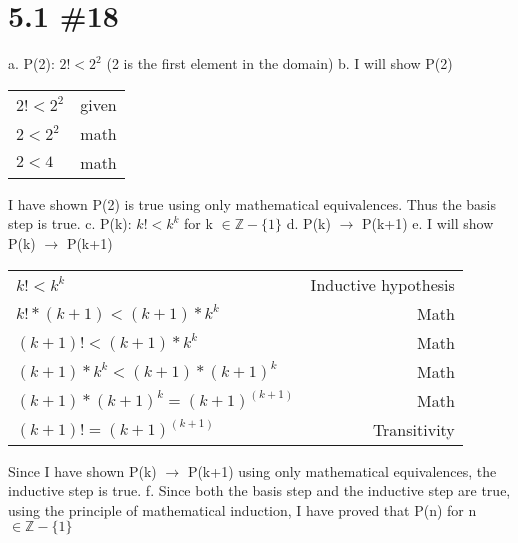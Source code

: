 \documentclass[h]{article}
\begin{document}
\section*{5.1 \#18}
a. P(2): $2! < 2^2$ (2 is the first element in the domain)\newline
b. I will show P(2)\newline
\begin{tabular}{l|r}
$2! < 2^2$ & given\\
$2 < 2^2$& math\\
$2 < 4$ & math\\
\end{tabular}\newline
I have shown P(2) is true using only mathematical equivalences. Thus the basis step is true.\newline
c. P(k): $k! < k^k$ for k $\in \mathbb{Z} - \{1\}$ \newline
d. P(k) $\rightarrow$ P(k+1)\newline
e. I will show P(k) $\rightarrow$ P(k+1)\newline
\begin{tabular}{l|r}
$k! < k^k$ & Inductive hypothesis\\
$k! * (k+1) < (k+1) * k^k$ & Math\\
$(k+1)! < (k+1) * k^k$ & Math\\
$(k+1) * k^k < (k+1) * (k+1)^k$ & Math\\
$(k+1) * (k+1)^k = (k+1)^(k+1)$ & Math\\
$(k+1)! = (k+1)^(k+1)$ & Transitivity\\
\end{tabular}\newline
Since I have shown P(k) $\rightarrow$ P(k+1) using only mathematical equivalences, the inductive step is true.\newline
f. Since both the basis step and the inductive step are true, using the principle of mathematical induction, I have proved that P(n) for n $\in \mathbb{Z} -\{1\}$ 
\end{document}
